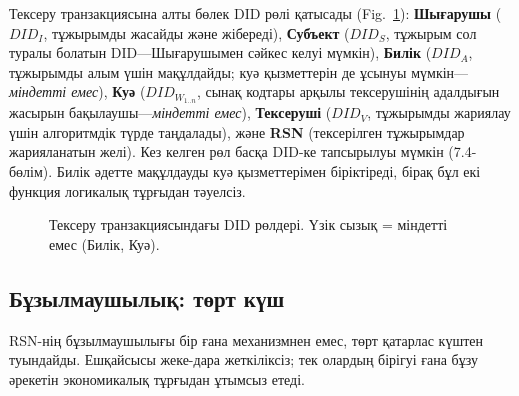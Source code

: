 \documentclass[11pt,a4paper,twocolumn]{article}
\begin{document}
Тексеру транзакциясына алты бөлек DID рөлі қатысады (Fig.~\ref{fig:roles}): \textbf{Шығарушы} ($DID_I$, тұжырымды жасайды және жібереді), \textbf{Субъект} ($DID_S$, тұжырым сол туралы болатын DID---Шығарушымен сәйкес келуі мүмкін), \textbf{Билік} ($DID_A$, тұжырымды алым үшін мақұлдайды; куә қызметтерін де ұсынуы мүмкін---\emph{міндетті емес}), \textbf{Куә} ($DID_{W_{1..n}}$, сынақ кодтары арқылы тексерушінің адалдығын жасырын бақылаушы---\emph{міндетті емес}), \textbf{Тексеруші} ($DID_V$, тұжырымды жариялау үшін алгоритмдік түрде таңдалады), және \textbf{RSN} (тексерілген тұжырымдар жарияланатын желі). Кез келген рөл басқа DID-ке тапсырылуы мүмкін (7.4-бөлім). Билік әдетте мақұлдауды куә қызметтерімен біріктіреді, бірақ бұл екі функция логикалық тұрғыдан тәуелсіз.

\begin{figure}[ht]
\centering
{}
\caption{Тексеру транзакциясындағы DID рөлдері. Үзік сызық = міндетті емес (Билік, Куә).}
\label{fig:roles}
\end{figure}

\subsection{Бұзылмаушылық: төрт күш}

RSN-нің бұзылмаушылығы бір ғана механизмнен емес, төрт қатарлас күштен туындайды. Ешқайсысы жеке-дара жеткіліксіз; тек олардың бірігуі ғана бұзу әрекетін экономикалық тұрғыдан ұтымсыз етеді.
\end{document}
